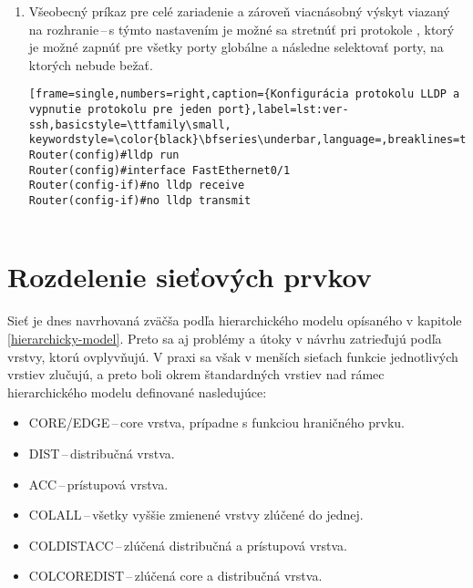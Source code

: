 \begin{enumerate}
	
	\item \vspace{2em} Všeobecný príkaz pre celé zariadenie a zároveň viacnásobný výskyt viazaný na rozhranie\,--\,s týmto nastavením je možné sa stretnúť pri protokole , ktorý je možné zapnúť pre všetky porty globálne a následne selektovať porty, na ktorých nebude bežať.
	
\begin{minipage}{\linewidth}		
\begin{lstlisting}[frame=single,numbers=right,caption={Konfigurácia protokolu LLDP a vypnutie protokolu pre jeden port},label=lst:ver-ssh,basicstyle=\ttfamily\small, keywordstyle=\color{black}\bfseries\underbar,language=,breaklines=true]
Router(config)#lldp run
Router(config)#interface FastEthernet0/1
Router(config-if)#no lldp receive
Router(config-if)#no lldp transmit
		

\end{lstlisting}
\end{minipage}
	
\end{enumerate}

\section{Rozdelenie sieťových prvkov}
Sieť je dnes navrhovaná zväčša podľa hierarchického modelu opísaného v kapitole \ref{hierarchicky-model}. Preto sa aj problémy a útoky v návrhu zatrieďujú podľa vrstvy, ktorú ovplyvňujú. V praxi sa však v menších sieťach funkcie jednotlivých vrstiev zlučujú, a preto boli okrem štandardných vrstiev nad rámec hierarchického modelu definované nasledujúce:

\begin{itemize}
	\item CORE/EDGE\,--\,core vrstva, prípadne s funkciou hraničného prvku.
	\item DIST\,--\,distribučná vrstva.
	\item ACC\,--\,prístupová vrstva.
	\item COLALL\,--\,všetky vyššie zmienené vrstvy zlúčené do jednej.
	\item COLDISTACC\,--\,zlúčená distribučná a prístupová vrstva.
	\item COLCOREDIST\,--\,zlúčená core a distribučná vrstva.
\end{itemize}


